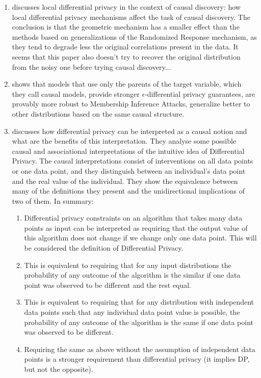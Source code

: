 \begin{enumerate}
\item \cite{binkyte2024causal} discusses local differential privacy in the context of causal discovery: how local differential privacy mechanisms affect the task of causal discovery. The conclusion is that the geometric mechanism has a smaller effect than the methods based on generalizations of the Randomized Response mechanism, as they tend to degrade less the original correlations present in the data. It seems that this paper also doesn't try to recover the original distribution from the noisy one before trying causal discovery...
\item \cite{tople2020alleviating} shows that models that use only the parents of the target variable, which they call causal models, provide stronger $\epsilon$-differential privacy guarantees, are provably more robust to Membership Inference Attacks, generalize better to other distributions based on the same causal structure.
\item \cite{tschantz2020sok} discusses how differential privacy can be interpreted as a causal notion and what are the benefits of this interpretation. They analyse some possible causal and associational interpretations of the intuitive idea of Differential Privacy. The causal interpretations consist of interventions on all data points or one data point, and they distinguish between an individual's data point and the real value of the individual. They show the equivalence between many of the definitions they present and the unidirectional implications of two of them. In summary: \begin{enumerate}
    \item Differential privacy constraints on an algorithm that takes many data points as input can be interpreted as requiring that the output value of this algorithm does not change if we change only one data point. This will be considered the definition of Differential Privacy.
    \item This is equivalent to requiring that for any input distributions the probability of any outcome of the algorithm is the similar if one data point was observed to be different and the rest equal.
    \item This is equivalent to requiring that for any distribution with independent data points such that any individual data point value is possible, the probability of any outcome of the algorithm is the same if one data point was observed to be different.
    \item Requiring the same as above without the assumption of independent data points is a stronger requirement than differential privacy (it implies DP, but not the opposite).

\end{enumerate}
\end{enumerate}
